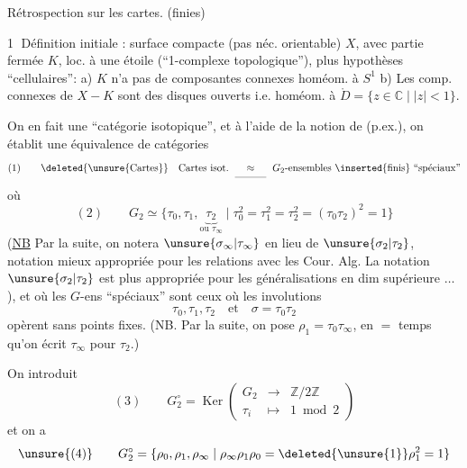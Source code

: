 
Rétrospection sur les cartes. (finies)

\textcircled{1} Définition initiale : surface compacte (pas néc. orientable) $X$, avec partie fermée $K$, loc.  à une étoile (``1-complexe topologique''), plus hypothèses ``cellulaires'': a) $K$ n'a pas de composantes connexes homéom. à $S^1$   b) Les comp. connexes de $X-K$ sont des disques ouverts i.e. homéom. à $\mathring D=\{z\in\mathbb C\mid |z|<1\}$.


On en fait une ``catégorie isotopique'', et à l'aide de la notion de  (p.ex.), on établit une équivalence de catégories
\[
(1)\qquad \deleted{\text{\unsure{Cartes}}}\quad\text{Cartes isot.}\ \underset{\rule{1.1cm}{0.3pt}}{\approx}\ G_2\text{-ensembles }\inserted{\text{finis}}\text{ ``spéciaux''}
\]
où
\[
(2)\qquad G_2\simeq\{\tau_0,\tau_1,\underbrace{\tau_2}_{\text{ou }\tau_\infty}\mid
\tau_0^2=\tau_1^2=\tau_2^2=(\tau_0\tau_2)^2=1\}
\]
(\uline{NB} Par la suite, on notera $\unsure{\sigma_\infty|\tau_\infty}$ en lieu de $\unsure{\sigma_2|\tau_2}$, notation mieux appropriée pour les relations avec les Cour. Alg. La notation $\unsure{\sigma_2|\tau_2}$ est plus appropriée pour les généralisations en dim supérieure $\ldots$),
et où les $G$-ens ``spéciaux'' sont ceux où les involutions
\[
\tau_0,\tau_1,\tau_2\quad\text{et}\quad\sigma=\tau_0\tau_2
\]
opèrent sans points fixes. (NB. Par la suite, on pose $\rho_1=\tau_0\tau_\infty$, en $=$ temps qu'on écrit $\tau_\infty$ pour $\tau_2$.)

On introduit
\[
(3)\qquad G_2^\circ=\operatorname{Ker}\left(\begin{array}{rcl}
G_2&\longrightarrow&\mathbb Z/2\mathbb Z\\
\tau_i&\longmapsto&1\bmod2
\end{array}\right)
\]
et on a
\[
\unsure{(4)}\qquad G_2^\circ=\{\rho_0,\rho_1,\rho_\infty\mid\rho_\infty\rho_1\rho_0=\deleted{\unsure{1}}\rho_1^2=1\}
\]
